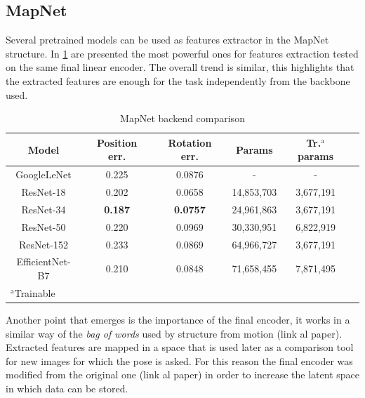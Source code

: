 \subsection{MapNet}
Several pretrained models can be used as features extractor in the MapNet structure. In \cref{tab:mapnet-backends} are presented the most powerful ones for features extraction tested on the same final linear encoder. The overall trend is similar, this highlights that the extracted features are enough for the task independently from the backbone used.
\begin{table}[htbp]
\caption{MapNet backend comparison}
\begin{center}
\begin{tabular}{|c|c|c|c|c|c|}
\hline
\textbf{Model}&\textbf{Position err.}&\textbf{Rotation err.}&\textbf{Params}&\textbf{Tr.$^{\mathrm{a}}$ params} \\
\hline
GoogleLeNet     &0.225         &0.0876         &-         &-         \\
ResNet-18       &0.202         &0.0658         &14,853,703&3,677,191 \\
ResNet-34       &\textbf{0.187}&\textbf{0.0757}&24,961,863&3,677,191 \\
ResNet-50       &0.220         &0.0969         &30,330,951&6,822,919 \\
ResNet-152      &0.233         &0.0869         &64,966,727&3,677,191 \\
EfficientNet-B7 &0.210         &0.0848         &71,658,455&7,871,495 \\
\hline
\multicolumn{4}{l}{$^{\mathrm{a}}$Trainable}
\end{tabular}
\label{tab:mapnet-backends}
\end{center}
\end{table}

Another point that emerges is the importance of the final encoder, it works in a similar way of the \textit{bag of words} used by structure from motion (link al paper). Extracted features are mapped in a space that is used later as a comparison tool for new images for which the pose is asked.
For this reason the final encoder was modified from the original one (link al paper) in order to increase the latent space in which data can be stored.

